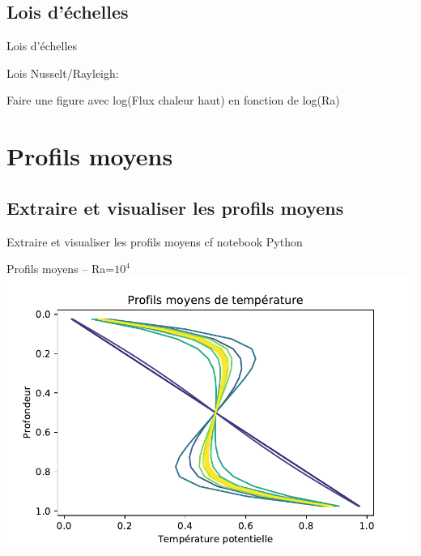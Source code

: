 \documentclass[9pt]{beamer}
\begin{document}
\subsection{Lois d'échelles}

\begin{frame}{Lois d'échelles}

Lois Nusselt/Rayleigh: 

Faire une figure avec log(Flux chaleur haut) en fonction de log(Ra)
    
\end{frame}

\section{Profils moyens}

\subsection{Extraire et visualiser les profils moyens}
\begin{frame}{Extraire et visualiser les profils moyens}
    cf notebook Python
\end{frame}

\begin{frame}{Profils moyens -- Ra=$10^4$}
\includegraphics[width=\textwidth]{fig/profils_moyens_Ra1e4.pdf}
\end{frame}
\end{document}
